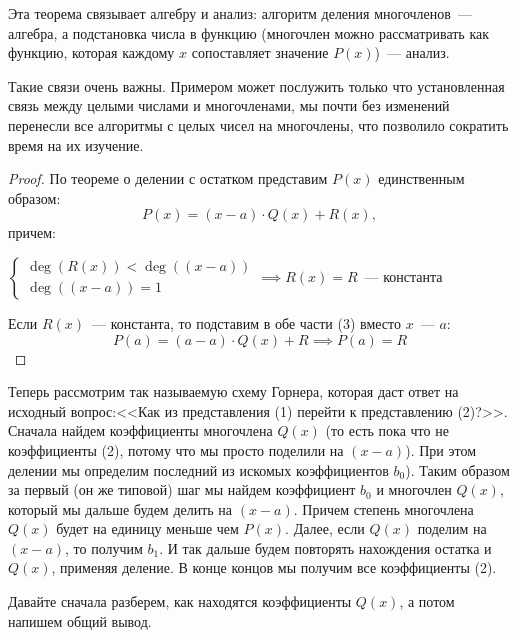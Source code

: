 \documentclass[russian]{lecture-notes}
\theoremstyle{definition}
\DeclareMathOperator{\Deg}{deg}
\newcommand{\D}[1]{\Deg(#1)}
\begin{document}
	\begin{note}
		Эта теорема связывает алгебру и анализ: алгоритм деления многочленов~--- алгебра, а подстановка числа в функцию (многочлен можно рассматривать как функцию, которая каждому $x$ сопоставляет значение $P(x)$)~--- анализ.
		
		Такие связи очень важны. Примером может послужить только что установленная связь между целыми числами и многочленами, мы почти без изменений перенесли все алгоритмы с целых чисел на многочлены, что позволило сократить время на их изучение. 
	\end{note}
	
	\begin{proof}
		По теореме о делении с остатком представим $P(x)$ единственным образом:
		\begin{equation}
			P(x) = (x-a) \cdot Q(x) + R(x),
		\end{equation}
		причем:
		
		$\begin{cases}
			\D{R(x)} < \D{(x-a)}\\
			\D{(x-a)} = 1
		\end{cases} \implies R(x) = R$~--- константа
		
		\noindent Если $R(x)$~--- константа, то подставим в обе части (3) вместо $x$~--- $a$:
		\[
			P(a) = (a-a) \cdot Q(x) + R \implies P(a) = R
		\]
		
	\end{proof}

	Теперь рассмотрим так называемую схему Горнера, которая даст ответ на исходный вопрос:<<Как из представления (1) перейти к представлению (2)?>>. Сначала найдем коэффициенты многочлена $Q(x)$ (то есть пока что не коэффициенты (2), потому что мы просто поделили на $(x-a)$). При этом делении мы определим последний из искомых коэффициентов $b_0$). Таким образом за первый (он же типовой) шаг мы найдем коэффициент $b_0$ и многочлен $Q(x)$, который мы дальше будем делить на $(x-a)$. Причем степень многочлена $Q(x)$ будет на единицу меньше чем $P(x)$. Далее, если $Q(x)$ поделим на $(x-a)$, то получим $b_1$. И так дальше будем повторять нахождения остатка и $Q(x)$, применяя деление. В конце концов мы получим все коэффициенты (2).
	
	Давайте сначала разберем, как находятся коэффициенты $Q(x)$, а потом напишем общий вывод. 
	
\end{document}
